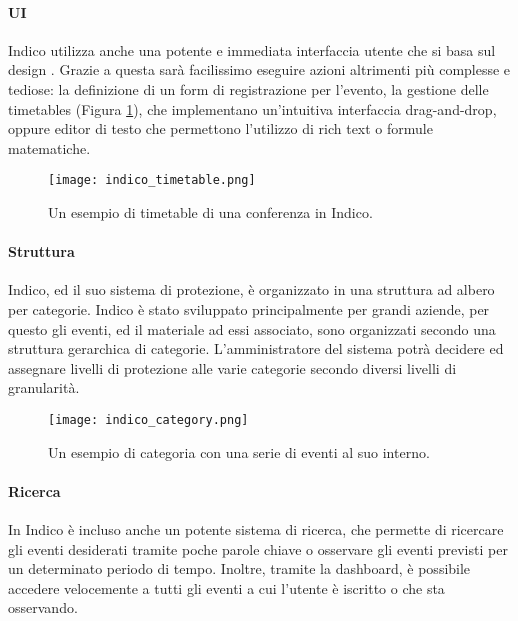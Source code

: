 		\paragraph{UI}Indico utilizza anche una potente e immediata interfaccia utente che si basa sul design . Grazie a questa  sarà facilissimo eseguire azioni altrimenti più complesse e tediose: la definizione di un form di registrazione per l'evento, la gestione delle timetables (Figura \ref{fig:indico_timetable}), che implementano un'intuitiva interfaccia drag-and-drop, oppure editor di testo che permettono l'utilizzo di rich text o formule matematiche.

		\begin{figure}[h!]
			\begin{center}
				\texttt{[image: indico\_timetable.png]}
			\end{center}
			\caption[Timetable in Indico (esempio)]{Un esempio di timetable di una conferenza in Indico.}
			\label{fig:indico_timetable}
		\end{figure}
		
		\paragraph{Struttura}Indico, ed il suo sistema di protezione, è organizzato in una struttura ad albero per categorie. Indico è stato sviluppato principalmente per grandi aziende, per questo gli eventi, ed il materiale ad essi associato, sono organizzati secondo una struttura gerarchica di categorie. L'amministratore del sistema potrà decidere ed assegnare livelli di protezione alle varie categorie secondo diversi livelli di granularità.

		\begin{figure}[h!]
			\begin{center}
				\texttt{[image: indico\_category.png]}
			\end{center}
			\caption[Categoria in Indico (esempio)]{Un esempio di categoria con una serie di eventi al suo interno.}
			\label{fig:indico_category}
		\end{figure}
		
		\paragraph{Ricerca}In Indico è incluso anche un potente sistema di ricerca, che permette di ricercare gli eventi desiderati tramite poche parole chiave o osservare gli eventi previsti per un determinato periodo di tempo. Inoltre, tramite la dashboard, è possibile accedere velocemente a tutti gli eventi a cui l'utente è iscritto o che sta osservando.
		
